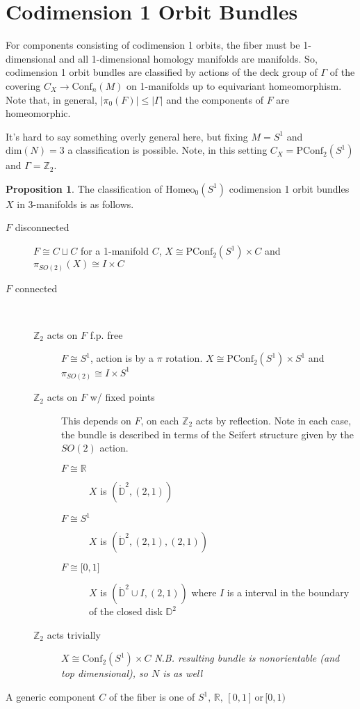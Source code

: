 \documentclass[10pt, oneside]{article}
\newcommand{\R}{\mathbb{R}}
\newcommand{\Z}{\mathbb{Z}}
\newcommand{\homeo}[1][S^1]{\text{Homeo}_0(#1)}
\newcommand{\conf}[2][S^1]{\text{Conf}_{#2}(#1)}
\newcommand{\pconf}[2][S^1]{\text{PConf}_{#2}(#1)}
\theoremstyle{definition}
\newtheorem{prop}{Proposition}[section]
\theoremstyle{definition}
\begin{document}
\section{Codimension 1 Orbit Bundles}
For components consisting of codimension 1 orbits, 
the fiber must be 1-dimensional 
and all 1-dimensional homology manifolds are manifolds. 
So, 
codimension 1 orbit bundles are classified 
by actions of the deck group of $\Gamma$ 
of the covering $C_X \to \conf[M]{n}$ on 1-manifolds 
up to equivariant homeomorphism.
Note that, 
in general, $\lvert \pi_0(F) \rvert \leq \lvert \Gamma \rvert$ 
and the components of $F$ are homeomorphic. 

It's hard to say something overly general here, 
but fixing $M = S^1$ 
and $\text{dim}(N)=3$ a classification is possible. 
Note, in this setting $C_X = \pconf{2}$ and $\Gamma = \Z_2$.

\begin{prop}
    The classification of $\homeo$ codimension 1 orbit bundles $X$ in 3-manifolds is as follows. 
    \begin{description}
        \item[$F$ disconnected] $F\cong C\sqcup C$ for a 1-manifold $C$, $X\cong \pconf{2}\times C$ and $\pi_{SO(2)}(X) \cong I \times C$
        \item[$F$ connected] \ 
        \begin{description}
            \item[$\Z_2$ acts on $F$ f.p. free] $F\cong S^1$, action is by a $\pi$ rotation. $X\cong \pconf{2} \times S^1$ and $\pi_{SO(2)} \cong I\times S^1$
            \item[$\Z_2$ acts on $F$ w/ fixed points] This depends on $F$, on each $\Z_2$ acts by reflection. Note in each case, the bundle is described in terms of the Seifert structure given by the $SO(2)$ action.
            \begin{description}
                \item[$F\cong \R$] $X$ is $(\mathring{\mathbb{D}}^2, (2, 1))$
                \item[$F\cong S^1$] $X$ is $(\mathring{\mathbb{D}}^2, (2, 1), (2,1))$
                \item[$F \cong \lbrack 0,1\rbrack$] $X$ is $(\mathring{\mathbb{D}}^2\cup I, (2,1))$ where $I$ is a interval in the boundary of the closed disk $\mathbb{D}^2$
            \end{description}
            \item[$\Z_2$ acts trivially] $X\cong\conf{2}\times C$ {\it N.B. resulting bundle is nonorientable (and top dimensional), so $N$ is as well} 
        \end{description}
    \end{description}
    A generic component $C$ of the fiber is one of $S^1,\, \mathbb{R},\, [0,1]\, \text{or}\,  [0,1)$
\end{prop}
\end{document}
